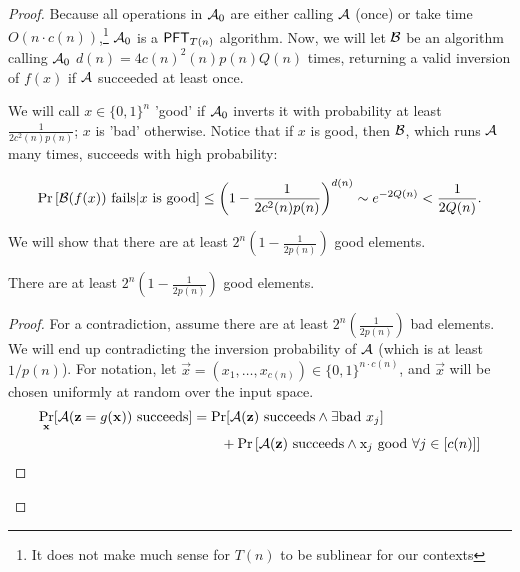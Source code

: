 \begin{proof}
	Because all operations in $\mathcal{A}_0$ are either calling $\mathcal{A}$ (once) or take time $O(n\cdot c(n))$,\footnote{It does not make much sense for $T(n)$ to be sublinear for our contexts} $\mathcal{A}_0$ is a $\mathsf{PFT}_{T(n)}$ algorithm. Now, we will let ${\cal B}$ be an algorithm calling $\mathcal{A}_0$ $d(n) = 4c(n)^2 (n)p(n)Q(n)$ times, returning a valid inversion of $f(x)$ if $\mathcal{A}$ succeeded at least once.
	
	We will call $x \in \{0,1\}^n$ 'good' if $\mathcal{A}_0$ inverts it with probability at least $\frac 1 {2c^2(n)p(n)}$; $x$ is 'bad' otherwise. Notice that if $x$ is good, then ${\cal B}$, which runs $\mathcal{A}$ many times, succeeds with high probability:
	
	\[ \Pr\left[{\cal B}(f(x)) \mbox{ fails} | x\mbox{ is good}\right] \le \left(1 - \frac 1{2c^2(n)p(n)}\right)^{d(n)} \sim e^{-2Q(n)} < \frac 1 {2Q(n)}. \]
	
	
	We will show that there are at least $2^n(1 - \frac{1}{2p(n)})$ good elements.
	
	
	\begin{claim}
		There are at least $2^n(1 - \frac{1}{2p(n)})$ good elements.
	\end{claim}
	\begin{proof}
		For a contradiction, assume there are at least $2^n(\frac{1}{2p(n)})$ bad elements. We will end up contradicting the inversion probability of $\mathcal{A}$ (which is at least $1/p(n)$). For notation, let $\vec x = (x_1, \dots, x_{c(n)}) \in \{0,1\}^{n\cdot c(n)}$, and $\vec x$ will be chosen uniformly at random over the input space.
		\begin{align*}
		\Pr_{\mathbf x}[\mathcal{A}(\mathbf z = g(\mathbf x)) \mbox{ succeeds}] &= \Pr[\mathcal{A}(\mathbf z)\mbox{ succeeds} \land \exists \mbox{bad }x_j]\\
		&\qquad + \Pr\left[\mathcal{A}(\mathbf z)\mbox{ succeeds} \land \mbox x_j \mbox{ good }\forall j \in [c(n)] \right]
		\end{align*}
		

\end{proof}
\end{proof}
